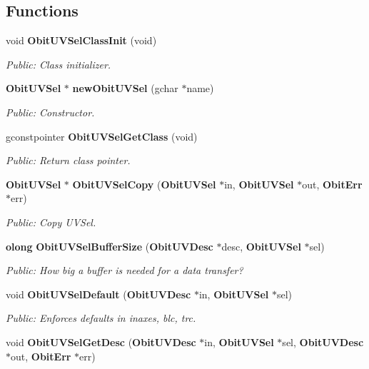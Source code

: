 \subsection*{Functions}
\begin{CompactItemize}
\item 
void {\bf Obit\-UVSel\-Class\-Init} (void)
\begin{CompactList}\small\item\em Public: Class initializer. \item\end{CompactList}\item 
{\bf Obit\-UVSel} $\ast$ {\bf new\-Obit\-UVSel} (gchar $\ast$name)
\begin{CompactList}\small\item\em Public: Constructor. \item\end{CompactList}\item 
gconstpointer {\bf Obit\-UVSel\-Get\-Class} (void)
\begin{CompactList}\small\item\em Public: Return class pointer. \item\end{CompactList}\item 
{\bf Obit\-UVSel} $\ast$ {\bf Obit\-UVSel\-Copy} ({\bf Obit\-UVSel} $\ast$in, {\bf Obit\-UVSel} $\ast$out, {\bf Obit\-Err} $\ast$err)
\begin{CompactList}\small\item\em Public: Copy UVSel. \item\end{CompactList}\item 
{\bf olong} {\bf Obit\-UVSel\-Buffer\-Size} ({\bf Obit\-UVDesc} $\ast$desc, {\bf Obit\-UVSel} $\ast$sel)
\begin{CompactList}\small\item\em Public: How big a buffer is needed for a data transfer? \item\end{CompactList}\item 
void {\bf Obit\-UVSel\-Default} ({\bf Obit\-UVDesc} $\ast$in, {\bf Obit\-UVSel} $\ast$sel)
\begin{CompactList}\small\item\em Public: Enforces defaults in inaxes, blc, trc. \item\end{CompactList}\item 
void {\bf Obit\-UVSel\-Get\-Desc} ({\bf Obit\-UVDesc} $\ast$in, {\bf Obit\-UVSel} $\ast$sel, {\bf Obit\-UVDesc} $\ast$out, {\bf Obit\-Err} $\ast$err)

\end{CompactItemize}
